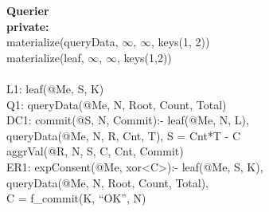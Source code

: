 \begin{code}
\textbf{Querier}\\
\textbf{private:}\\
\> materialize(queryData, $\infty$, $\infty$, keys(1, 2))\\
\> materialize(leaf, $\infty$, $\infty$, keys(1,2))\\
\\
L1: leaf(@Me, S, K)\\
Q1: queryData(@Me, N, Root, Count, Total)\\
DC1: commit(@S, N, Commit):- leaf(@Me, N, L),\\
\> queryData(@Me, N, R, Cnt, T), S = Cnt*T - C\\
\> aggrVal(@R, N, S, C, Cnt, Commit)\\
ER1: expConsent(@Me, xor<C>):- leaf(@Me, S, K),\\
\> queryData(@Me, N, Root, Count, Total),\\
\> C =  f\_commit(K, ``OK'', N)
\end{code}
